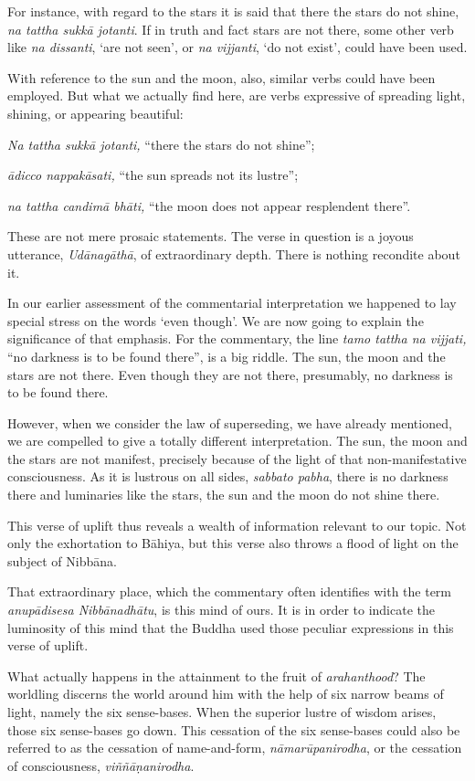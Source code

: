 For instance, with regard to the stars it is said that there the stars do not shine, \emph{na tattha sukkā jotanti}. If in truth and fact stars are not there, some other verb like \emph{na dissanti}, `are not seen', or \emph{na vijjanti}, `do not exist', could have been used.

With reference to the sun and the moon, also, similar verbs could have been employed. But what we actually find here, are verbs expressive of spreading light, shining, or appearing beautiful:

\emph{Na tattha sukkā jotanti,} ``there the stars do not shine'';

\emph{ādicco nappakāsati,} ``the sun spreads not its lustre'';

\emph{na tattha candimā bhāti,} ``the moon does not appear resplendent there''.

These are not mere prosaic statements. The verse in question is a joyous utterance, \emph{Udānagāthā}, of extraordinary depth. There is nothing recondite about it.

In our earlier assessment of the commentarial interpretation we happened to lay special stress on the words `even though'. We are now going to explain the significance of that emphasis. For the commentary, the line \emph{tamo tattha na vijjati,} ``no darkness is to be found there'', is a big riddle. The sun, the moon and the stars are not there. Even though they are not there, presumably, no darkness is to be found there.

However, when we consider the law of superseding, we have already mentioned, we are compelled to give a totally different interpretation. The sun, the moon and the stars are not manifest, precisely because of the light of that non-manifestative consciousness. As it is lustrous on all sides, \emph{sabbato pabha}, there is no darkness there and luminaries like the stars, the sun and the moon do not shine there.

This verse of uplift thus reveals a wealth of information relevant to our topic. Not only the exhortation to Bāhiya, but this verse also throws a flood of light on the subject of Nibbāna.

That extraordinary place, which the commentary often identifies with the term \emph{anupādisesa Nibbānadhātu}, is this mind of ours. It is in order to indicate the luminosity of this mind that the Buddha used those peculiar expressions in this verse of uplift.

What actually happens in the attainment to the fruit of \emph{arahanthood}? The worldling discerns the world around him with the help of six narrow beams of light, namely the six sense-bases. When the superior lustre of wisdom arises, those six sense-bases go down. This cessation of the six sense-bases could also be referred to as the cessation of name-and-form, \emph{nāmarūpanirodha}, or the cessation of consciousness, \emph{viññāṇanirodha}.


